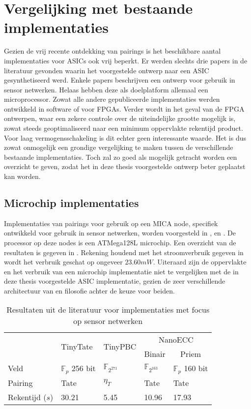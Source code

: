 \section{Vergelijking met bestaande implementaties}

Gezien de vrij recente ontdekking van pairings is het beschikbare aantal implementaties voor ASICs ook vrij beperkt. Er werden slechts drie papers in de literatuur gevonden waarin het voorgestelde ontwerp naar een ASIC gesynthetiseerd werd. Enkele papers beschrijven een ontwerp voor gebruik in sensor netwerken. Helaas hebben deze als doelplatform allemaal een microprocessor. Zowat alle andere gepubliceerde implementaties werden ontwikkeld in software of voor FPGAs. Verder wordt in het geval van de FPGA ontwerpen, waar een zekere controle over de uiteindelijke grootte mogelijk is, zowat steeds geoptimaliseerd naar een minimum oppervlakte rekentijd product. Voor laag vermogensschakeling is dit echter geen interessante waarde. Het is dus zowat onmogelijk een grondige vergelijking te maken tussen de verschillende bestaande implementaties. Toch zal zo goed als mogelijk getracht worden een overzicht te geven, zodat het in deze thesis voorgestelde ontwerp beter geplaatst kan worden.

\subsection{Microchip implementaties}

Implementaties van pairings voor gebruik op een MICA node, specifiek ontwikkeld voor gebruik in sensor netwerken, worden voorgesteld in \cite{tinytate}, \cite{tinypbc} en \cite{nanoecc}. De processor op deze nodes is een ATMega128L microchip. Een overzicht van de resultaten is gegeven in . Rekening houdend met het stroomverbruik gegeven in \cite{nanoecc} wordt het verbruik geschat op ongeveer $23.60mW$. Uiteraard zijn de oppervlakte en het verbruik van een microchip implementatie niet te vergelijken met de in deze thesis voorgestelde ASIC implementatie, gezien de zeer verschillende architectuur van en filosofie achter de keuze voor beiden.

\begin{table}[h]
	\caption{Resultaten uit de literatuur voor implementaties met focus op sensor netwerken}
	\label{tabel-resultaten-sensor}

	\centering
	\begin{tabular}{lllll}
		\toprule
		& \multirow{2}{*}{TinyTate \cite{tinytate}}	& \multirow{2}{*}{TinyPBC \cite{tinypbc}} &	\multicolumn{2}{c}{NanoECC \cite{nanoecc}}\\
		\cmidrule{4-5}
		& & & \multicolumn{1}{c}{Binair} & \multicolumn{1}{c}{Priem}\\
			\midrule
		Veld					& $\mathbb{F}_{p}$ 256 bit	& $\mathbb{F}_{2^{271}}$	& $\mathbb{F}_{2^{163}}$	& $\mathbb{F}_{p}$ 160 bit\\
		Pairing				& Tate							& $\eta_T$ 						& Tate							& Tate\\
		Rekentijd ($s$)	& 30.21							& 5.45							& 10.96							& 17.93\\
		\bottomrule
	\end{tabular}
\end{table}

